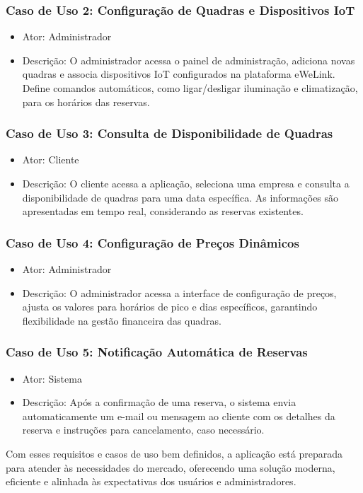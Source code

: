 \subsubsection*{Caso de Uso 2: Configuração de Quadras e Dispositivos IoT}
\begin{itemize}
     \item Ator: Administrador
     \item Descrição: O administrador acessa o painel de administração, adiciona novas quadras e associa dispositivos IoT configurados na plataforma eWeLink. Define comandos automáticos, como ligar/desligar iluminação e climatização, para os horários das reservas.     
\end{itemize}

\subsubsection*{Caso de Uso 3: Consulta de Disponibilidade de Quadras}
\begin{itemize}
     \item Ator: Cliente
     \item Descrição: O cliente acessa a aplicação, seleciona uma empresa e consulta a disponibilidade de quadras para uma data específica. As informações são apresentadas em tempo real, considerando as reservas existentes.     
\end{itemize}

\subsubsection*{Caso de Uso 4: Configuração de Preços Dinâmicos}
\begin{itemize}
     \item Ator: Administrador
     \item Descrição: O administrador acessa a interface de configuração de preços, ajusta os valores para horários de pico e dias específicos, garantindo flexibilidade na gestão financeira das quadras.     
\end{itemize}

\subsubsection*{Caso de Uso 5: Notificação Automática de Reservas}
\begin{itemize}
     \item Ator: Sistema
     \item Descrição: Após a confirmação de uma reserva, o sistema envia automaticamente um e-mail ou mensagem ao cliente com os detalhes da reserva e instruções para cancelamento, caso necessário.     
\end{itemize}

Com esses requisitos e casos de uso bem definidos, a aplicação está preparada para atender às necessidades do mercado, oferecendo uma solução moderna, eficiente e alinhada às expectativas dos usuários e administradores.